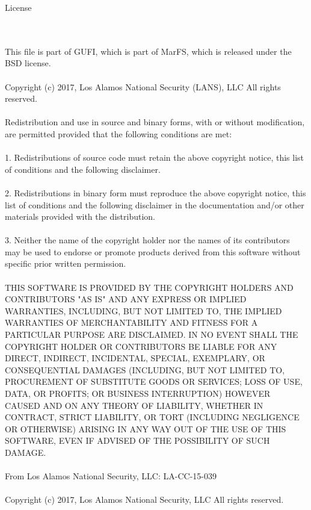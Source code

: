  
\begin{Huge}
License
\end{Huge} 
\\
\\
 This file is part of GUFI, which is part of MarFS, which is released
 under the BSD license.
\\
\\
 Copyright (c) 2017, Los Alamos National Security (LANS), LLC
 All rights reserved.
\\
\\
 Redistribution and use in source and binary forms, with or without modification,
 are permitted provided that the following conditions are met:
\\
\\
 1. Redistributions of source code must retain the above copyright notice, this
 list of conditions and the following disclaimer.
\\
\\
 2. Redistributions in binary form must reproduce the above copyright notice,
 this list of conditions and the following disclaimer in the documentation and/or
 other materials provided with the distribution.
\\
\\
 3. Neither the name of the copyright holder nor the names of its contributors
 may be used to endorse or promote products derived from this software without
 specific prior written permission.
\\
\\
 THIS SOFTWARE IS PROVIDED BY THE COPYRIGHT HOLDERS AND CONTRIBUTORS "AS IS" AND
 ANY EXPRESS OR IMPLIED WARRANTIES, INCLUDING, BUT NOT LIMITED TO, THE IMPLIED
 WARRANTIES OF MERCHANTABILITY AND FITNESS FOR A PARTICULAR PURPOSE ARE DISCLAIMED.
 IN NO EVENT SHALL THE COPYRIGHT HOLDER OR CONTRIBUTORS BE LIABLE FOR ANY DIRECT,
 INDIRECT, INCIDENTAL, SPECIAL, EXEMPLARY, OR CONSEQUENTIAL DAMAGES (INCLUDING,
 BUT NOT LIMITED TO, PROCUREMENT OF SUBSTITUTE GOODS OR SERVICES; LOSS OF USE,
 DATA, OR PROFITS; OR BUSINESS INTERRUPTION) HOWEVER CAUSED AND ON ANY THEORY OF
 LIABILITY, WHETHER IN CONTRACT, STRICT LIABILITY, OR TORT (INCLUDING NEGLIGENCE
 OR OTHERWISE) ARISING IN ANY WAY OUT OF THE USE OF THIS SOFTWARE, EVEN IF
 ADVISED OF THE POSSIBILITY OF SUCH DAMAGE.
\\
\\
 From Los Alamos National Security, LLC:
 LA-CC-15-039
\\
\\
 Copyright (c) 2017, Los Alamos National Security, LLC All rights reserved.

